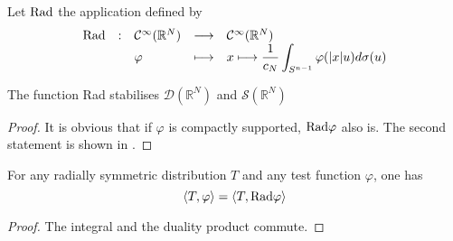 \documentclass[11pt,a4paper]{article}
\begin{document}
\begin{Def} Let $\textup{Rad}$ the application defined by \[\begin{array}{lllll} \textup{Rad} & : & \mathcal{C}^\infty(\mathbb{R}^N) & \longrightarrow & \mathcal{C}^\infty(\mathbb{R}^N) \\ & & \varphi & \longmapsto &\displaystyle x\longmapsto\frac{1}{c_N}\int_{S^{n-1}}\varphi(|x|u)d\sigma(u) \\ \end{array}\]
\end{Def}

\begin{Prop} The function Rad stabilises $\mathcal{D}(\mathbb{R}^N)$ and $\mathcal{S}(\mathbb{R}^N)$
\begin{proof}
It is obvious that if $\varphi$ is compactly supported, $\textup{Rad}\varphi$ also is. The second statement is shown in \cite{SphericalAverage}. 
\end{proof} 
\end{Prop}

\begin{Prop} For any radially symmetric distribution $T$ and any test function $\varphi$, one has \[\left\langle T,\varphi\right\rangle = \left\langle T,\textup{Rad}\varphi\right\rangle\]
\begin{proof}
The integral and the duality product commute. 
\end{proof}
\end{Prop}
\end{document}
